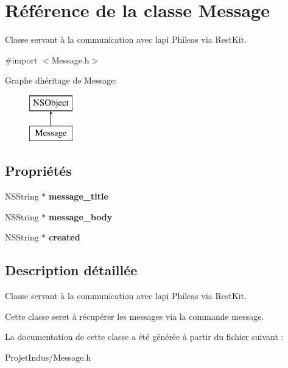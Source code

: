 \hypertarget{interface_message}{}\section{Référence de la classe Message}
\label{interface_message}


Classe servant à la communication avec l\textquotesingle{}api Phileas via Rest\+Kit.  




{\ttfamily \#import $<$Message.\+h$>$}

Graphe d\textquotesingle{}héritage de Message\+:\begin{figure}[H]
\begin{center}
\leavevmode
\includegraphics[height=2.000000cm]{interface_message}
\end{center}
\end{figure}
\subsection*{Propriétés}
\begin{DoxyCompactItemize}
\item 
\hypertarget{interface_message_a9947956b6c2acaea7fb9261096148bea}{}N\+S\+String $\ast$ {\bfseries message\+\_\+title}\label{interface_message_a9947956b6c2acaea7fb9261096148bea}

\item 
\hypertarget{interface_message_a89ec0b84ab7e2749f6c0905f48397686}{}N\+S\+String $\ast$ {\bfseries message\+\_\+body}\label{interface_message_a89ec0b84ab7e2749f6c0905f48397686}

\item 
\hypertarget{interface_message_accb6b77ef8581292f87614ac85ba2593}{}N\+S\+String $\ast$ {\bfseries created}\label{interface_message_accb6b77ef8581292f87614ac85ba2593}

\end{DoxyCompactItemize}


\subsection{Description détaillée}
Classe servant à la communication avec l\textquotesingle{}api Phileas via Rest\+Kit. 

Cette classe seret à récupérer les messages via la commande message. 

La documentation de cette classe a été générée à partir du fichier suivant \+:\begin{DoxyCompactItemize}
\item 
Projet\+Indus/Message.\+h\end{DoxyCompactItemize}
